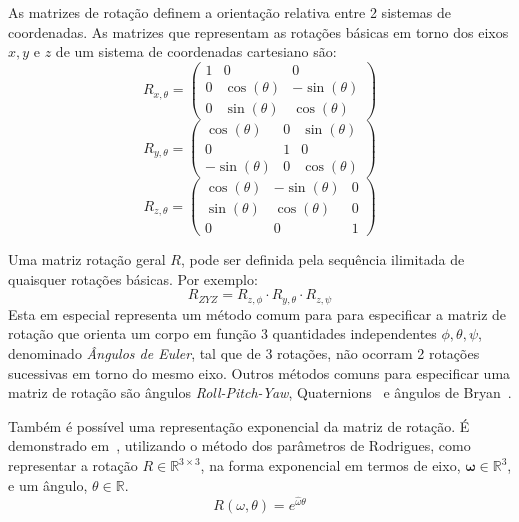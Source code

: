 As matrizes de rotação definem a orientação relativa entre 2 sistemas de
coordenadas. As matrizes que representam as rotações básicas em torno
dos eixos $x, y$ e $z$ de um sistema de coordenadas cartesiano são: 
%
\begin{equation}
	R_{x,\theta} = 
\begin{pmatrix}
1 &0  &0 \\ 
0 &\cos(\theta)  &-\sin(\theta) \\ 
0 &\sin(\theta)  &\cos(\theta) 
\end{pmatrix}
\end{equation}
%
\begin{equation}
R_{y,\theta} = 
\begin{pmatrix}
\cos(\theta) &0  &\sin(\theta) \\ 
0 &1  &0 \\ 
-\sin(\theta) &0  &\cos(\theta) 
\end{pmatrix}
\end{equation}
%
\begin{equation}
R_{z,\theta} = 
\begin{pmatrix}
\cos(\theta) &-\sin(\theta)  &0 \\ 
\sin(\theta) &\cos(\theta)  &0 \\ 
0 &0  &1
\end{pmatrix}
\end{equation}
%

Uma matriz rotação geral $R$, pode ser definida pela sequência ilimitada de
quaisquer rotações básicas. Por exemplo:
%
\begin{equation}
	R_{ZYZ} = R_{z,\phi} \cdot R_{y,\theta} \cdot R_{z,\psi}
\end{equation}
%
Esta em especial representa um método comum para para especificar a matriz de
rotação que orienta um corpo em função 3 quantidades independentes $\phi,
\theta, \psi$, denominado \emph{Ângulos de Euler}, tal que de 3 rotações, não
ocorram 2 rotações sucessivas em torno do mesmo eixo.
Outros métodos comuns para especificar uma matriz de rotação são ângulos
\textit{Roll-Pitch-Yaw}, Quaternions~\cite{sciavicco2012modelling} e ângulos de
Bryan~\cite{wittenburg2013dynamics}.

Também é possível uma representação exponencial da matriz de rotação. É
demonstrado em~\cite{murray1994mathematical}, utilizando o método dos parâmetros
de Rodrigues, como representar a rotação $R \in \mathbb{R}^{3\times3}$, na forma
exponencial em termos de eixo, $\boldsymbol{\omega} \in \mathbb{R}^{3}$, e um
ângulo, $\theta \in \mathbb{R}$.
%
\begin{equation}
	R(\omega, \theta) = e^{\hat{\omega} \theta}
\end{equation}
%

